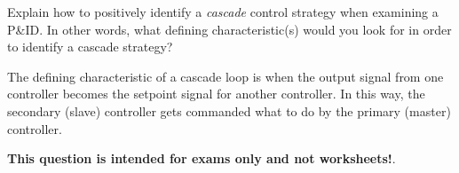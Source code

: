

Explain how to positively identify a {\it cascade} control strategy when examining a P\&ID.  In other words, what defining characteristic(s) would you look for in order to identify a cascade strategy?







The defining characteristic of a cascade loop is when the output signal from one controller becomes the setpoint signal for another controller.  In this way, the secondary (slave) controller gets commanded what to do by the primary (master) controller.







{\bf This question is intended for exams only and not worksheets!}.



